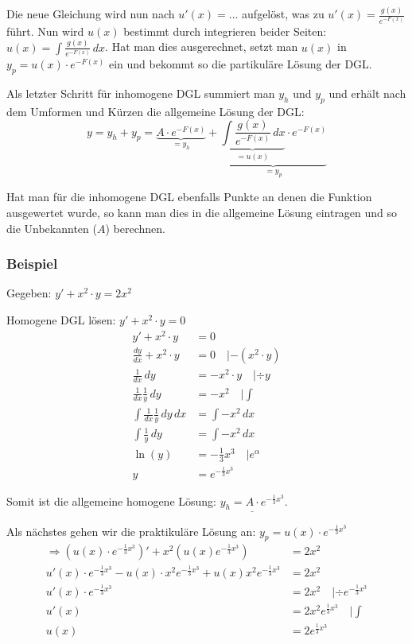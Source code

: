 Die neue Gleichung wird nun nach $u'(x) = \ldots$ aufgelöst, was zu
$u'(x) = \frac{g(x)}{e^{-F(x)}}$ führt. Nun wird $u(x)$ bestimmt durch integrieren
beider Seiten: $u(x) = \int \frac{g(x)}{e^{-F(x)}}\,dx$. Hat man dies ausgerechnet,
setzt man $u(x)$ in $y_p = u(x) \cdot e^{-F(x)}$ ein und bekommt so die partikuläre
Lösung der DGL.

Als letzter Schritt für inhomogene DGL summiert man $y_h$ und $y_p$ und erhält nach
dem Umformen und Kürzen die allgemeine Lösung der DGL:
{\small
\[
y = y_h + y_p = 
\underbrace{A \cdot e^{-F(x)}}_{= y_h} +
\underbrace{\underbrace{\int \frac{g(x)}{e^{-F(x)}}\,dx}_{= u(x)} \cdot e^{-F(x)}}_{= y_p}
\]
}

Hat man für die inhomogene DGL ebenfalls Punkte an denen die Funktion ausgewertet wurde,
so kann man dies in die allgemeine Lösung eintragen und so die Unbekannten ($A$) berechnen.

\subsubsection{Beispiel}
Gegeben: $y' + x^2 \cdot y = 2x^2$

Homogene DGL lösen: $y' + x^2 \cdot y = 0$
\begin{align*}
y' + x^2 \cdot y &= 0\\
\frac{dy}{dx} + x^2 \cdot y &= 0 \quad | -(x^2 \cdot y)\\
\frac{1}{dx}\, dy &= -x^2 \cdot y \quad | \div y\\
\frac{1}{dx} \frac{1}{y} \, dy &= -x^2 \quad | \int\\
\int \frac{1}{dx} \frac{1}{y} \, dy \, dx &= \int -x^2 \, dx\\
\int \frac{1}{y}\, dy &= \int -x^2 \, dx\\
\ln(y) &= -\frac{1}{3} x^3 \quad | e^\alpha\\
y &= e^{-\frac{1}{3}x^3}
\end{align*}

Somit ist die allgemeine homogene Lösung: $\underline{y_h = A \cdot e^{-\frac{1}{3}x^3}}$.


Als nächstes gehen wir die praktikuläre Lösung an:
$y_p = u(x) \cdot e^{-\frac{1}{3}x^3}$
\begin{align*}
\Rightarrow (u(x) \cdot e^{-\frac{1}{3}x^3})' + x^2 (u(x) e^{-\frac{1}{3}x^3}) &= 2 x^2\\
u'(x) \cdot e^{-\frac{1}{3}x^3} - u(x) \cdot x^2 e^{-\frac{1}{3}x^3} + u(x) x^2 e^{-\frac{1}{3}x^3} &= 2 x^2\\
u'(x) \cdot e^{-\frac{1}{3}x^3} &= 2 x^2 \quad | \div e^{-\frac{1}{3}x^3}\\
u'(x) &= 2 x^2 e^{\frac{1}{3}x^3} \quad | \int\\
u(x) &= 2 e^{\frac{1}{3}x^3}
\end{align*}

